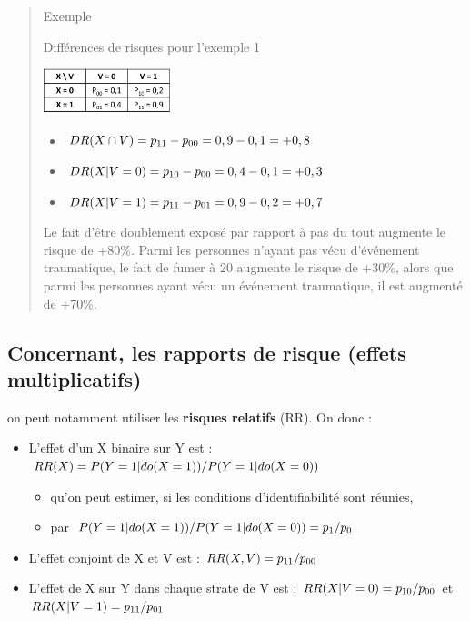\documentclass[
]{book}
\providecommand{\tightlist}{%
  \setlength{\itemsep}{0pt}\setlength{\parskip}{0pt}}
\begin{document}
\begin{quote}
Exemple

Différences de risques pour l'exemple 1

\includegraphics[width=0.3\textwidth,height=\textheight]{img/Image1.png}

\begin{itemize}
\tightlist
\item
  \(\small DR(X \cap V) = p_{11}-p_{00} = 0,9 - 0,1 = +0,8\)
\item
  \(\small DR (X | V=0) = p_{10}-p_{00} = 0,4 - 0,1 = +0,3\)
\item
  \(\small DR (X | V=1) = p_{11}-p_{01} = 0,9 - 0,2 = +0,7\)
\end{itemize}

Le fait d'être doublement exposé par rapport à pas du tout augmente le risque de +80\%. Parmi les personnes n'ayant pas vécu d'événement traumatique, le fait de fumer à 20 augmente le risque de +30\%, alors que parmi les personnes ayant vécu un événement traumatique, il est augmenté de +70\%.
\end{quote}

\hypertarget{concernant-les-rapports-de-risque-effets-multiplicatifs}{%
\subsection*{Concernant, les rapports de risque (effets multiplicatifs)}\label{concernant-les-rapports-de-risque-effets-multiplicatifs}}

on peut notamment utiliser les \textbf{risques relatifs} (RR). On donc :

\begin{itemize}
\tightlist
\item
  L'effet d'un X binaire sur Y est : \(\small RR(X) = P(Y = 1| do(X = 1)) / P(Y = 1|do(X = 0))\)

  \begin{itemize}
  \tightlist
  \item
    qu'on peut estimer, si les conditions d'identifiabilité sont réunies,
  \item
    par \(\small P(Y = 1| do(X = 1)) / P(Y = 1|do(X = 0))= p_1 / p_0\)
  \end{itemize}
\item
  L'effet conjoint de X et V est : \(\small RR(X,V) = p_{11}/p_{00}\)
\item
  L'effet de X sur Y dans chaque strate de V est : \(\small RR(X|V=0) = p_{10}/p_{00}\) et \(\small RR(X|V=1) =p_{11}/p_{01}\)
\end{itemize}
\end{document}
